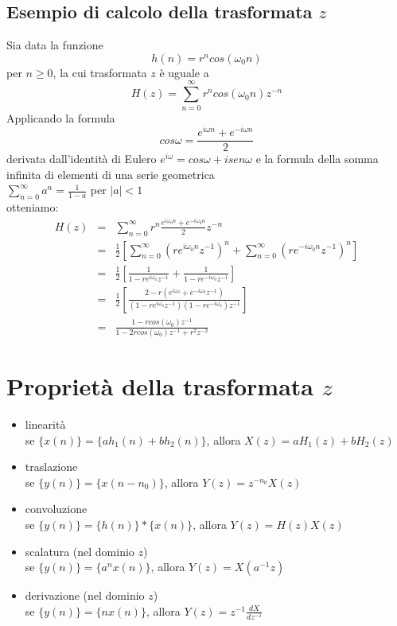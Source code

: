 \subsection*{Esempio di calcolo della trasformata $z$}
Sia data la funzione
\begin{displaymath}
h(n)=r^n cos(\omega_0 n)
\end{displaymath}
per $n\ge 0$, la cui trasformata $z$ \`e uguale a 
\begin{displaymath}
H(z)=\sum_{n=0}^\infty r^n cos(\omega_0 n)z^{-n}
\end{displaymath}
Applicando la formula
\begin{displaymath}
cos \omega = \frac{e^{i\omega n} + e^{-i\omega n}}{2}
\end{displaymath}
derivata dall'identit\`a di Eulero $e^{i\omega}=cos\omega + isen\omega$ 
e la formula della somma infinita di elementi di una serie geometrica\\
$\sum_{n=0}^\infty a^n = \frac{1}{1-a}$ per $|a|<1$ \\
otteniamo:
\begin{eqnarray*}
H(z) & = & \sum_{n=0}^\infty r^{n} \frac{e^{i\omega_0 n}+e^{-i\omega_0 n}}{2}z^{-n}\\
     & = & \frac{1}{2} \left [ \sum_{n=0}^\infty (re^{i\omega_0 n}z^{-1})^n + \sum_{n=0}^\infty (re^{-i\omega_0 n}z^{-1})^n\right ] \\
     & = & \frac{1}{2} \left [ \frac{1}{1-re^{i \omega_0}z^{-1}} + \frac{1}{1-re^{-i \omega_0}z^{-1}} \right ]\\
     & = & \frac{1}{2} \left [ \frac{2-r(e^{i\omega_0}+e^{-i\omega_0}z^{-1})}{(1-re^{i \omega_0}z^{-1})(1-re^{-i \omega_0})z^{-1}} \right ] \\
     & = & \frac{1-rcos(\omega_0)z^{-1}}{1-2rcos(\omega_0)z^{-1}+r^2 z^{-2}}
\end{eqnarray*}

\section{Propriet\`a della trasformata $z$}
\begin{itemize}
\item linearit\`a\\ se $\{x(n)\}=\{ah_1(n)+bh_2(n)\}$, allora $X(z)=aH_1(z)+bH_2(z)$
\item traslazione\\ se $\{y(n)\}=\{x(n-n_0)\}$, allora $Y(z)=z^{-n_0}X(z)$
\item convoluzione\\ se $\{y(n)\}=\{h(n)\}\ast\{x(n)\}$, allora $Y(z)=H(z)X(z)$
\item scalatura (nel dominio $z$)\\ se $\{y(n)\}=\{a^n x(n)\}$, allora $Y(z)=X(a^{-1} z)$
\item derivazione (nel dominio $z$)\\ se $\{y(n)\}=\{nx(n)\}$, allora $Y(z)=z^{-1} \frac{dX}{dz^{-1}}$
\end{itemize}

